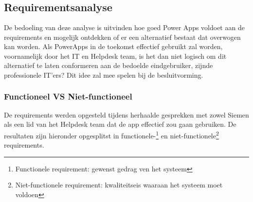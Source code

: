 
\chapter{}
\label{ch:methodologie}



\section{Requirementsanalyse}


De bedoeling van deze analyse is uitvinden hoe goed Power Apps voldoet aan de requirements en mogelijk ontdekken of er een alternatief bestaat dat overwogen kan worden. Als PowerApps in de toekomst effectief gebruikt zal worden, voornamelijk door het IT en Helpdesk team, is het dan niet logisch om dit alternatief te laten conformeren aan de bedoelde eindgebruiker, zijnde professionele IT'ers? Dit idee zal mee spelen bij de besluitvorming.

\subsection{Functioneel VS Niet-functioneel}
De requirements werden opgesteld tijdens herhaalde gesprekken met zowel Siemen als een lid van het Helpdesk team dat de app effectief zou gaan gebruiken.
De resultaten zijn hieronder opgesplitst in functionele-\footnote{Functionele requirement: gewenst gedrag ven het systeem} en niet-functionele\footnote{Niet-functionele requirement: kwaliteitseis waaraan het systeem moet voldoen} requirements.

